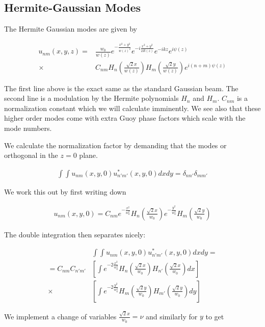 \documentclass[12pt]{article}
\begin{document}
\subsection{Hermite-Gaussian Modes}

The Hermite Gaussian modes are given by

\begin{align}
u_{nm}(x,y,z) = &\frac{w_0}{w(z)} e^{-\frac{x^2+y^2}{w(z)^2}} e^{-i\frac{x^2+y^2}{2R(z)}} e^{-ikz} e^{i\psi(z)}\\
\times& C_{nm}H_n\left(\frac{\sqrt{2}x}{w(z)}\right)H_m\left(\frac{\sqrt{2}y}{w(z)}\right)e^{i(n+m)\psi(z)}
\end{align}

The first line above is the exact same as the standard Gaussian beam.
The second line is a modulation by the Hermite polynomials $H_n$ and $H_m$.
$C_{nm}$ is a normalization constant which we will calculate imminently.
We see also that these higher order modes come with extra Guoy  phase factors which scale with the mode numbers.

We calculate the normalization factor by demanding that the modes or orthogonal in the $z=0$ plane.

\begin{align}
\int\int u_{nm}(x,y,0)u_{n'm'}^*(x,y,0) dx dy = \delta_{nn'}\delta_{mm'}
\end{align}

We work this out by first writing down

\begin{align}
u_{nm}(x, y, 0) = C_{nm}e^{-\frac{x^2}{w_0^2}} H_n\left(\frac{\sqrt{2}x}{w_0}\right) e^{-\frac{y^2}{w_0^2}}H_m\left(\frac{\sqrt{2}y}{w_0}\right)
\end{align}

The double integration then separates nicely:

\begin{align}
&\int\int u_{nm}(x,y,0)u_{n'm'}^*(x,y,0) dx dy =\\
= C_{nm}C_{n'm'} &\left[\int e^{-2\frac{x^2}{w_0^2}}H_n\left(\frac{\sqrt{2}x}{w_0}\right) H_{n'}\left(\frac{\sqrt{2}x}{w_0}\right) dx \right]\\
\times &\left[\int e^{-2\frac{y^2}{w_0^2}}H_m\left(\frac{\sqrt{2}y}{w_0}\right) H_{m'}\left(\frac{\sqrt{2}y}{w_0}\right) dy \right]
\end{align}

We implement a change of variables $\frac{\sqrt{2}x}{w_0} = \nu$ and similarly for $y$ to get
\end{document}
